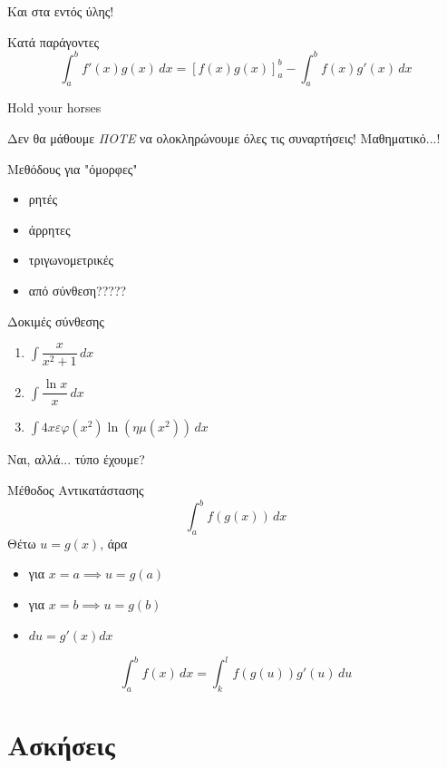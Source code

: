 \documentclass[greek]{beamer}
\begin{document}
\begin{frame}{Και στα εντός ύλης!}
 \begin{block}{Κατά παράγοντες}
  $$\int_a^b f'(x)g(x)\,dx=\left[ f(x)g(x) \right]_a^b -\int_a^b f(x)g'(x)\,dx$$
 \end{block}
\end{frame}

\begin{frame}{Hold your horses}

 Δεν θα μάθουμε \emph{ΠΟΤΕ} να ολοκληρώνουμε όλες τις συναρτήσεις! Μαθηματικό...!

 Μεθόδους για "όμορφες"

 \begin{itemize}
  \item<2-> ρητές
  \item<3-> άρρητες
  \item<4-> τριγωνομετρικές
  \item<5-> από σύνθεση?????
 \end{itemize}

\end{frame}

\begin{frame}{Δοκιμές σύνθεσης}
 \begin{enumerate}
  \item<1-> $\int \dfrac{x}{x^2+1}\,dx$
  \item<2-> $\int \dfrac{\ln x}{x}\, dx$
  \item<3-> $\int 4xεφ(x^2)\ln (ημ(x^2))\, dx$
 \end{enumerate}

\end{frame}

\begin{frame}{Ναι, αλλά... τύπο έχουμε?}
 \begin{block}{Μέθοδος Αντικατάστασης}
   $$\int_a^b f(g(x))\, dx$$
   Θέτω $u=g(x)$, άρα
   \begin{itemize}
     \item για $x=a\implies u=g(a)$
     \item για $x=b\implies u=g(b)$
     \item $du=g'(x)dx$
   \end{itemize}
   $$\int_a^b f(x)\, dx=\int_k^l f(g(u))g'(u)\,du$$
 \end{block}

\end{frame}

\section{Ασκήσεις}
\end{document}
